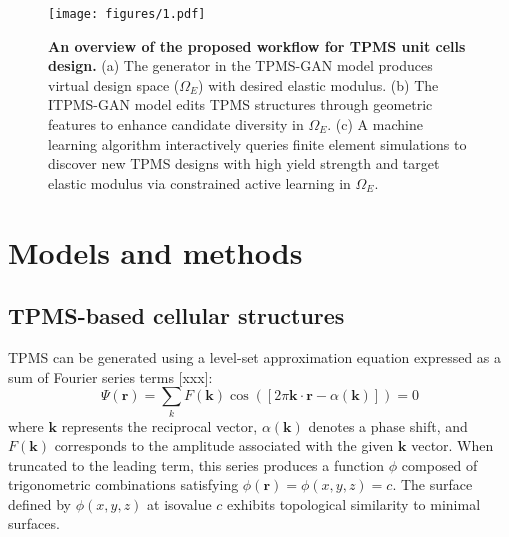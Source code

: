 \documentclass[preprint,review,12pt,authoryear]{elsarticle}
\begin{document}
\begin{figure}
    \centering
    \texttt{[image: figures/1.pdf]}
    \caption{\textbf{An overview of the proposed workflow for TPMS unit cells design.} (a) The generator in the TPMS-GAN model produces virtual design space ($\Omega_E$) with desired elastic modulus. (b) The ITPMS-GAN model edits TPMS structures through geometric features to enhance candidate diversity in $\Omega_E$. (c) A machine learning algorithm interactively queries finite element simulations to discover new TPMS designs with high yield strength and target elastic modulus via constrained active learning in $\Omega_E$.}
    \label{fig:1}
\end{figure}

\section{Models and methods}
\subsection{TPMS-based cellular structures}
TPMS can be generated using a level-set approximation equation expressed as a sum of Fourier series terms [xxx]:
\begin{equation}
 \Psi(\boldsymbol{r})=\sum_kF(\boldsymbol{k})\cos\left([2\pi \boldsymbol{k}\cdot \boldsymbol{r}-\alpha(\boldsymbol{k})]\right)=0
\label{eq:1}
\end{equation}
where $\boldsymbol{k}$ represents the reciprocal vector, $\alpha(\boldsymbol{k})$ denotes a phase shift, and $F(\boldsymbol{k})$ corresponds to the amplitude associated with the given $\boldsymbol{k}$ vector. When truncated to the leading term, this series produces a function $\phi$ composed of trigonometric combinations satisfying $\phi(\boldsymbol{r})=\phi(x,y,z)=c$. The surface defined by $\phi(x, y, z)$ at isovalue $c$ exhibits topological similarity to minimal surfaces.
\end{document}
